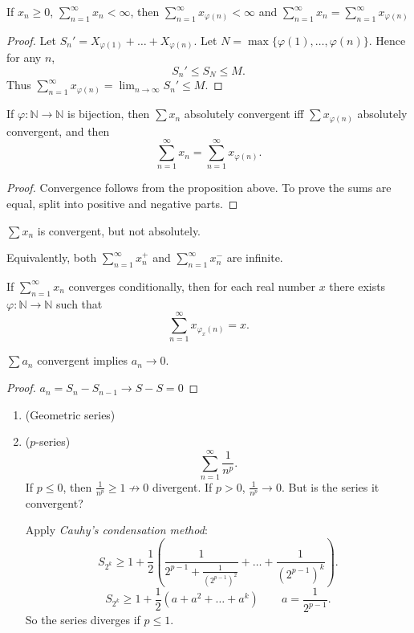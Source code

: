 \begin{theorem}
	If $x_n \ge 0$, $\sum_{n=1}^{\infty} x_n < \infty $, then $\sum_{n=1}^{\infty} x_{\varphi(n)} < \infty $ and $\sum_{n=1}^{\infty} x_{n} = \sum_{n=1}^{\infty} x_{\varphi(n)}$
\end{theorem}
\begin{proof}
	Let $S_n' = X_{\varphi(1)} + \ldots + X_{\varphi(n)}$. Let $N = \max \{\varphi(1), \ldots, \varphi(n) \} $.
	Hence for any $n$,
	\[
		S_n' \le S_N \le M
	.\] 
	Thus $\sum_{n=1}^{\infty} x_{\varphi(n)} = \lim_{n \to \infty} S_n' \le M$.
\end{proof}
\begin{theorem}
	If $\varphi: \mathbb{N}\to \mathbb{N}$ is bijection, then $\sum x_n$ absolutely convergent iff $\sum x_{\varphi(n)}$ absolutely convergent, and then 
	\[
		\sum_{n=1}^{\infty} x_n 
		= \sum_{n=1}^{\infty} x_{\varphi(n)}
	.\] 
\end{theorem}
\begin{proof}
	Convergence follows from the proposition above. To prove the sums are equal, split into positive and negative parts. 
\end{proof}

\begin{definition}
	$\sum x_n$ is convergent, but not absolutely.
\end{definition}
Equivalently, both $\sum_{n=1}^{\infty } x_n^+$ and $\sum_{n=1}^{\infty} x_n^-$ are infinite.

\begin{theorem}
	If $\sum_{n=1}^{\infty} x_n$ converges conditionally, then for each real number $x$ there exists $\varphi: \mathbb{N}\to \mathbb{N}$ such that
	\[
		\sum_{n=1}^{\infty} x_{\varphi_x(n)} = x
	.\] 
\end{theorem}

\begin{proposition}
	$\sum a_n$ convergent implies $a_n \to 0$.
\end{proposition}
\begin{proof}
	$a_n = S_n - S_{n-1} \to S - S = 0$
\end{proof}

\begin{example}
	\begin{enumerate}
	\item (Geometric series)
	\item ($p$-series)
		\[
		\sum_{n=1}^{\infty} \frac{1}{n^p}
		.\] 
		If $p\le 0$, then $\frac{1}{n^p}\ge 1 \not \to 0$ divergent.
		If $p>0$, $\frac{1}{n^p} \to 0$. But is the series it convergent?

		Apply \textit{Cauhy's condensation method}: 
		\[
		S_{2^k}\ge 1 + \frac{1}{2} \left( \frac{1}{2^{p-1} + \frac{1}{(2^{p-1})^2}} + \ldots + \frac{1}{(2^{p-1})^k} \right) 		.\] 
		 \[
			S_{2^k} \ge  1 + \frac{1}{2} \left( a + a^2 + \ldots + a^k \right) \qquad a = \frac{1}{2^{p-1}}
		.\] 
		So the series diverges if $p \le 1$.
	\end{enumerate}
\end{example}

